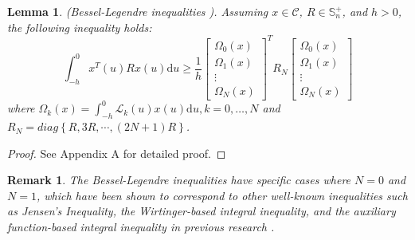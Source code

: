 \documentclass[a4paper]{cas-sc}
\newtheorem{lemma}[theorem]{Lemma}
\newtheorem*{proof}{Proof}
\newtheorem{remark}[theorem]{Remark}
\begin{document}
\begin{lemma}
  \label{lemma5}
  (Bessel-Legendre inequalities \citep{Lee2018}). Assuming $x \in \mathcal{C} $, $R \in \mathbb{S}_n^ +  $, and $h > 0$, the following inequality holds:
  \begin{equation}
    \int_{ - h}^0 {{x^T}} (u)Rx(u){\text{d}}u \geqslant \frac{1}{h}{\left[ {\begin{array}{*{20}{c}}
              {{\Omega _0}(x)} \\
              {{\Omega _1}(x)} \\
              \vdots           \\
              {{\Omega _N}(x)}
            \end{array}} \right]^T}{R_N}\left[ {\begin{array}{*{20}{c}}
            {{\Omega _0}(x)} \\
            {{\Omega _1}(x)} \\
            \vdots           \\
            {{\Omega _N}(x)}
          \end{array}} \right]
    \label{eqlemma5}
  \end{equation}
  where ${\Omega _k}(x) = \int_{ - h}^0 {{\mathcal{L}_k}} (u)x(u){\text{d}}u,k = 0, \ldots ,N$ and ${R_N} = diag\left\{ {R,3R, \cdots ,(2N + 1)R} \right\}$.
\end{lemma}
\begin{proof}
  See Appendix A for detailed proof.
\end{proof}

\begin{remark}
  The Bessel-Legendre inequalities have specific cases where $N=0$ and $N=1$, which have been shown to correspond to other well-known inequalities such as Jensen's Inequality, the Wirtinger-based integral inequality, and the auxiliary function-based integral inequality in previous research \citep{Seuret2013, Park2015}.
\end{remark}
\end{document}
